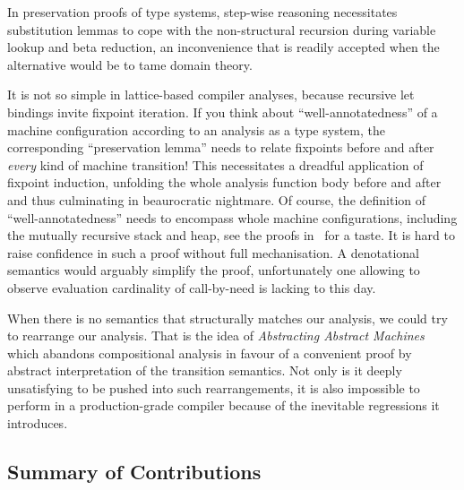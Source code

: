 In preservation proofs of type systems, step-wise reasoning necessitates
substitution lemmas to cope with the non-structural recursion during variable
lookup and beta reduction, an inconvenience that is readily accepted when the
alternative would be to tame domain theory.

It is not so simple in lattice-based compiler analyses, because recursive let
bindings invite fixpoint iteration. If you think about ``well-annotatedness''
of a machine configuration according to an analysis as a type system, the
corresponding ``preservation lemma'' needs to relate fixpoints before and after
\emph{every} kind of machine transition! This necessitates a dreadful application of fixpoint
induction, unfolding the whole analysis function body before and after and thus
culminating in beaurocratic nightmare.
Of course, the definition of ``well-annotatedness'' needs to encompass whole
machine configurations, including the mutually recursive stack and heap, see the
proofs in~\cite{cardinality-ext} for a taste. It is hard to raise confidence in
such a proof without full mechanisation.
A denotational semantics would arguably simplify the proof, unfortunately one
allowing to observe evaluation cardinality of call-by-need is lacking to this
day.

When there is no semantics that structurally matches our analysis, we could
try to rearrange our analysis. That is the idea of \emph{Abstracting Abstract
Machines}~\cite{aam} which abandons compositional analysis in favour of a
convenient proof by abstract interpretation of the transition semantics.
Not only is it deeply unsatisfying to be pushed into such rearrangements, it
is also impossible to perform in a production-grade compiler because of the
inevitable regressions it introduces.

\subsection{Summary of Contributions}

